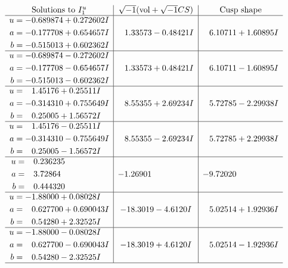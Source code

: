 \documentclass[1p]{elsarticle_modified}
\theoremstyle{definition}
\newcommand{\I}{\sqrt{-1}}
\begin{document}
$$\begin{array}{c|c|c}  
\text{Solutions to }I^u_{1}& \I (\text{vol} + \sqrt{-1}CS) & \text{Cusp shape}\\
 \hline 
\begin{aligned}
u &= -0.689874 + 0.272602 I \\
a &= -0.177708 + 0.654657 I \\
b &= -0.515013 + 0.602362 I\end{aligned}
 & \phantom{-}1.33573 - 0.48421 I & \phantom{-}6.10711 + 1.60895 I \\ \hline\begin{aligned}
u &= -0.689874 - 0.272602 I \\
a &= -0.177708 - 0.654657 I \\
b &= -0.515013 - 0.602362 I\end{aligned}
 & \phantom{-}1.33573 + 0.48421 I & \phantom{-}6.10711 - 1.60895 I \\ \hline\begin{aligned}
u &= \phantom{-}1.45176 + 0.25511 I \\
a &= -0.314310 + 0.755649 I \\
b &= \phantom{-}0.25005 + 1.56572 I\end{aligned}
 & \phantom{-}8.55355 + 2.69234 I & \phantom{-}5.72785 - 2.29938 I \\ \hline\begin{aligned}
u &= \phantom{-}1.45176 - 0.25511 I \\
a &= -0.314310 - 0.755649 I \\
b &= \phantom{-}0.25005 - 1.56572 I\end{aligned}
 & \phantom{-}8.55355 - 2.69234 I & \phantom{-}5.72785 + 2.29938 I \\ \hline\begin{aligned}
u &= \phantom{-}0.236235\phantom{ +0.000000I} \\
a &= \phantom{-}3.72864\phantom{ +0.000000I} \\
b &= \phantom{-}0.444320\phantom{ +0.000000I}\end{aligned}
 & -1.26901\phantom{ +0.000000I} & -9.72020\phantom{ +0.000000I} \\ \hline\begin{aligned}
u &= -1.88000 + 0.08028 I \\
a &= \phantom{-}0.627700 + 0.690043 I \\
b &= \phantom{-}0.54280 + 2.32525 I\end{aligned}
 & -18.3019 - 4.6120 I & \phantom{-}5.02514 + 1.92936 I \\ \hline\begin{aligned}
u &= -1.88000 - 0.08028 I \\
a &= \phantom{-}0.627700 - 0.690043 I \\
b &= \phantom{-}0.54280 - 2.32525 I\end{aligned}
 & -18.3019 + 4.6120 I & \phantom{-}5.02514 - 1.92936 I\\
 \hline 
 \end{array}$$\newpage\newpage\renewcommand{\arraystretch}{1}
\end{document}
